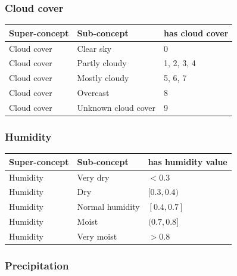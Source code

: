 \subsubsection{Cloud cover}

\begin{longtable}{|p{}|p{}|p{}|}
  \hline
  \textbf{Super-concept} & \textbf{Sub-concept} & \textbf{has cloud cover} \\
  \hline\hline
  Cloud cover & Clear sky & 0 \\
  \hline
  Cloud cover & Partly cloudy & 1, 2, 3, 4 \\
  \hline
  Cloud cover & Mostly cloudy & 5, 6, 7 \\
  \hline
  Cloud cover & Overcast & 8 \\
  \hline
  Cloud cover & Unknown cloud cover & 9 \\
  \hline
\end{longtable}

\subsubsection{Humidity}

\begin{longtable}{|p{}|p{}|p{}|}
  \hline
  \textbf{Super-concept} & \textbf{Sub-concept} & \textbf{has humidity value} \\
  \hline\hline
  Humidity & Very dry & $< 0.3$ \\
  \hline
  Humidity & Dry & $[0.3, 0.4)$ \\
  \hline
  Humidity & Normal humidity & $[0.4, 0.7]$ \\
  \hline
  Humidity & Moist & $(0.7, 0.8]$ \\
  \hline
  Humidity & Very moist & $> 0.8$ \\
  \hline
\end{longtable}

\subsubsection{Precipitation}

